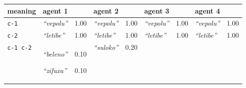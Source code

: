 
{\footnotesize\renewcommand{\arraystretch}{1.5}
\begin{tabular}{@{}p{1.2cm}|p{1.6cm}@{}p{0.8cm}@{}|p{1.6cm}@{}p{0.8cm}@{}|p{1.6cm}@{}p{0.8cm}@{}|p{1.6cm}@{}p{0.8cm}@{}}
meaning & agent 1 &  & agent 2 &  & agent 3 &  & agent 4 & \\
\hline
\texttt{c-1}&\textit{``vepolu''}
&1.00&\textit{``vepolu''}
&1.00&\textit{``vepolu''}
&1.00&\textit{``vepolu''}
&1.00\\
\hline
\texttt{c-2}&\textit{``letibe''}
&1.00&\textit{``letibe''}
&1.00&\textit{``letibe''}
&1.00&\textit{``letibe''}
&1.00\\
\hline
\texttt{c-1 c-2}&\textit{``beleno''}

\textit{``zifuxa''}
&0.10

0.10&\textit{``suloko''}
&0.20&&&&
\end{tabular}}

